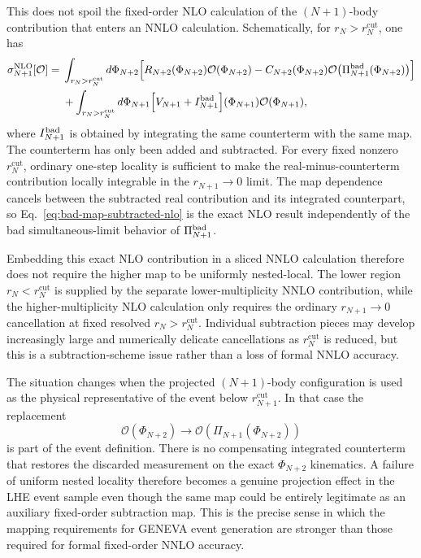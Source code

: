 \documentclass[11pt]{article}
\newcommand{\rn}{r_N}
\newcommand{\rnp}{r_{N+1}}
\newcommand{\cut}{\mathrm{cut}}
\newcommand{\Ph}{\Phi}
\newcommand{\Ocal}{\mathcal{O}}
\begin{document}
This does not spoil the fixed-order NLO calculation of the \((N+1)\)-body contribution that enters an NNLO
calculation. Schematically, for \(\rn>\rn^{\cut}\), one has
\begin{align}
\sigma_{N+1}^{\rm NLO}[\Ocal]
={}&
\int_{\rn>\rn^{\cut}}d\Ph_{N+2}
\Bigl[
R_{N+2}(\Ph_{N+2})\Ocal(\Ph_{N+2})
-
C_{N+2}(\Ph_{N+2})
\Ocal\!\left(\Pi_{N+1}^{\rm bad}(\Ph_{N+2})\right)
\Bigr]
\nonumber\\
&+
\int_{\rn>\rn^{\cut}}d\Ph_{N+1}
\Bigl[V_{N+1}+I_{N+1}^{\rm bad}\Bigr](\Ph_{N+1})
\Ocal(\Ph_{N+1}),
\label{eq:bad-map-subtracted-nlo}
\end{align}
where \(I_{N+1}^{\rm bad}\) is obtained by integrating the same counterterm with the same map. The counterterm
has only been added and subtracted. For every fixed nonzero \(\rn^{\cut}\), ordinary one-step locality is
sufficient to make the real-minus-counterterm contribution locally integrable in the
\(\rnp\to0\) limit. The map dependence cancels between the subtracted real contribution and its integrated
counterpart, so Eq.~\eqref{eq:bad-map-subtracted-nlo} is the exact NLO result independently of the bad
simultaneous-limit behavior of \(\Pi_{N+1}^{\rm bad}\).

Embedding this exact NLO contribution in a sliced NNLO calculation therefore does not require the higher map
to be uniformly nested-local. The lower region \(\rn<\rn^{\cut}\) is supplied by the separate
lower-multiplicity NNLO contribution, while the higher-multiplicity NLO calculation only requires the
ordinary \(\rnp\to0\) cancellation at fixed resolved \(\rn>\rn^{\cut}\). Individual subtraction pieces may
develop increasingly large and numerically delicate cancellations as \(\rn^{\cut}\) is reduced, but this is
a subtraction-scheme issue rather than a loss of formal NNLO accuracy.

The situation changes when the projected \((N+1)\)-body configuration is used as the physical representative
of the event below \(\rnp^{\cut}\). In that case the replacement
\begin{equation}
\Ocal(\Ph_{N+2})
\longrightarrow
\Ocal\!\left(\Pi_{N+1}(\Ph_{N+2})\right)
\label{eq:physical-projection-replacement}
\end{equation}
is part of the event definition. There is no compensating integrated counterterm that restores the discarded
measurement on the exact \(\Ph_{N+2}\) kinematics. A failure of uniform nested locality therefore becomes a
genuine projection effect in the LHE event sample even though the same map could be entirely legitimate as
an auxiliary fixed-order subtraction map. This is the precise sense in which the mapping requirements for
GENEVA event generation are stronger than those required for formal fixed-order NNLO accuracy.
\end{document}
